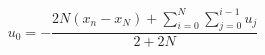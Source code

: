 \documentclass{article}
\begin{document}
\thispagestyle{empty}

$$
u_0 = -\frac{ 2N(x_n-x_N)+  \sum\limits_{i=0}^N \sum\limits_{j=0}^{i-1}u_j }{2+2N}
$$
\end{document}
